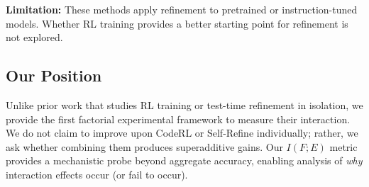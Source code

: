 \textbf{Limitation:} These methods apply refinement to pretrained or instruction-tuned models. Whether RL training provides a better starting point for refinement is not explored.

\subsection{Our Position}

Unlike prior work that studies RL training or test-time refinement in isolation, we provide the first factorial experimental framework to measure their interaction. We do not claim to improve upon CodeRL or Self-Refine individually; rather, we ask whether combining them produces superadditive gains. Our $I(F;E)$ metric provides a mechanistic probe beyond aggregate accuracy, enabling analysis of \emph{why} interaction effects occur (or fail to occur).
